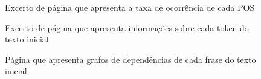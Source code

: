 \documentclass[12pt]{article}
\begin{document}
\begin{figure}[!ht]
	\centering
	\setlength{\abovecaptionskip}{-.4cm}
	\caption{Excerto de página que apresenta a taxa de ocorrência de cada POS}
\end{figure}

\begin{figure}[!ht]
	\centering
	\setlength{\abovecaptionskip}{-.4cm}
	\caption{Excerto de página que apresenta informações sobre cada token do texto inicial}
\end{figure}

\begin{figure}[!ht]
	\centering
	\setlength{\abovecaptionskip}{-.4cm}
	\caption{Página que apresenta grafos de dependências de cada frase do texto inicial}
\end{figure}
\end{document}

